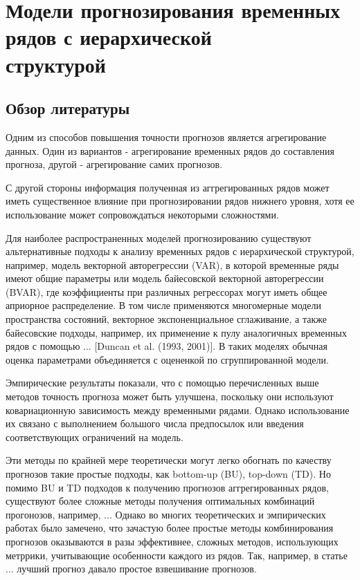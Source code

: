 \documentclass[12pt,a4paper, oneside]{extreport}
\begin{document}
\chapter{Модели прогнозирования временных рядов  с иерархической \\ структурой}



\section{Обзор литературы}

Одним из способов повышения точности прогнозов является агрегирование данных. Один из вариантов - агрегирование временных рядов до составления прогноза, другой - агрегирование самих прогнозов. 

С другой стороны информация полученная из аггрегированных рядов может иметь существенное влияние при прогнозировании рядов нижнего уровня, хотя ее использование может сопровождаться некоторыми сложностями. 

Для наиболее распространенных моделей прогнозированию существуют альтернативные подходы к анализу временных рядов с иерархической структурой, например, модель  векторной авторегрессии (VAR), в которой  временные ряды имеют общие параметры или модель байесовской векторной авторегрессии (BVAR), где коэффициенты  при различных регрессорах могут иметь общее априорное распределение.  В том числе применяются многомерные модели пространства состояний, векторное  экспоненциальное сглаживание, а также  байесовские подходы, например, их применение к пулу аналогичных временных рядов с помощью ... [Duncan et al. (1993, 2001)].
В таких моделях обычная оценка параметрами объединяется с оцененкой по сгруппированной модели. 

Эмпирические результаты показали, что с помощью перечисленных выше методов точность прогноза может быть улучшена, поскольку они используют ковариационную зависимость  между временными рядами. Однако использование их связано с выполнением большого числа предпосылок или введения соответствующих ограничений на модель.


Эти методы по крайней мере теоретически могут легко обогнать по качеству прогнозов такие простые подходы, как bottom-up (BU), top-down (TD).
Но помимо BU и TD подходов к получению прогнозов аггрегированных рядов, существуют более сложные методы получения  оптимальных комбинаций прогонозов, например, ...
Однако во многих теоретических и эмпирических работах было замечено, что зачастую более простые методы комбинирования прогнозов оказываются в разы эффективнее, сложных методов, использующих метррики, учитывающие особенности каждого из рядов. Так, например, в статье ... лучший прогноз давало простое взвешивание прогнозов. 
\end{document}
